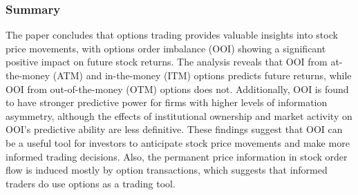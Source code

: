 \documentclass[10pt]{report}
\begin{document}
\subsubsection{Summary}

The paper concludes that options trading provides valuable insights into stock price movements, with options order imbalance (OOI) showing a significant positive impact on future stock returns. The analysis reveals that OOI from at-the-money (ATM) and in-the-money (ITM) options predicts future returns, while OOI from out-of-the-money (OTM) options does not. Additionally, OOI is found to have stronger predictive power for firms with higher levels of information asymmetry, although the effects of institutional ownership and market activity on OOI’s predictive ability are less definitive. These findings suggest that OOI can be a useful tool for investors to anticipate stock price movements and make more informed trading decisions. Also, the permanent price information in stock order flow is induced mostly by option transactions, which suggests that informed traders do use options as a trading tool.












\end{document}

